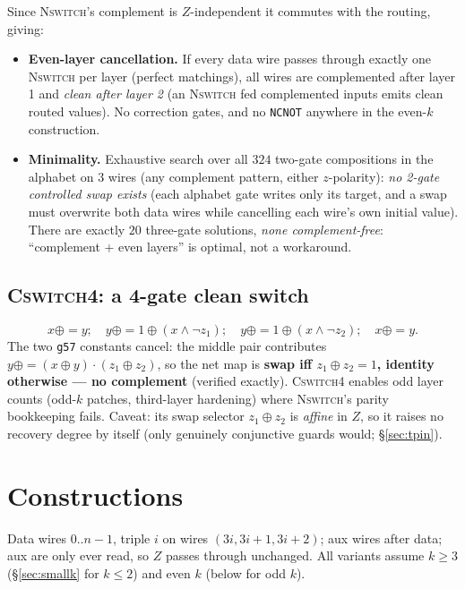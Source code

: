 \documentclass[11pt]{article}
\theoremstyle{remark}
\newcommand{\g}{\texttt{g57}}
\newcommand{\NCNOT}{\texttt{NCNOT}}
\newcommand{\NSW}{\textsc{Nswitch}}
\newcommand{\CSW}{\textsc{Cswitch4}}
\begin{document}
Since \NSW's complement is $Z$-independent it commutes with the routing, giving:
\begin{itemize}
\item \textbf{Even-layer cancellation.} If every data wire passes through exactly one \NSW{} per
layer (perfect matchings), all wires are complemented after layer 1 and \emph{clean after
layer 2} (an \NSW{} fed complemented inputs emits clean routed values). No correction gates, and
no \NCNOT{} anywhere in the even-$k$ construction.
\item \textbf{Minimality.} Exhaustive search over all $324$ two-gate compositions in the
alphabet on $3$ wires (any complement pattern, either $z$-polarity): \emph{no 2-gate controlled
swap exists} (each alphabet gate writes only its target, and a swap must overwrite both data
wires while cancelling each wire's own initial value). There are exactly $20$ three-gate
solutions, \emph{none complement-free}: ``complement + even layers'' is optimal, not a
workaround.
\end{itemize}

\subsection{\CSW: a 4-gate clean switch}

\[
x\mathrel{\oplus{=}}y;\quad
y\mathrel{\oplus{=}}1\oplus(x\wedge\neg z_1);\quad
y\mathrel{\oplus{=}}1\oplus(x\wedge\neg z_2);\quad
x\mathrel{\oplus{=}}y .
\]
The two \g{} constants cancel: the middle pair contributes
$y\mathrel{\oplus{=}}(x\oplus y)\cdot(z_1\oplus z_2)$, so the net map is \textbf{swap iff
$z_1\oplus z_2=1$, identity otherwise --- no complement} (verified exactly). \CSW{} enables odd
layer counts (odd-$k$ patches, third-layer hardening) where \NSW's parity bookkeeping fails.
Caveat: its swap selector $z_1\oplus z_2$ is \emph{affine} in $Z$, so it raises no recovery
degree by itself (only genuinely conjunctive guards would; \S\ref{sec:tpin}).

\section{Constructions}\label{sec:constructions}

Data wires $0..n{-}1$, triple $i$ on wires $(3i,3i{+}1,3i{+}2)$; aux wires after data; aux are
only ever read, so $Z$ passes through unchanged. All variants assume $k\ge3$
(\S\ref{sec:smallk} for $k\le2$) and even $k$ (below for odd $k$).
\end{document}
